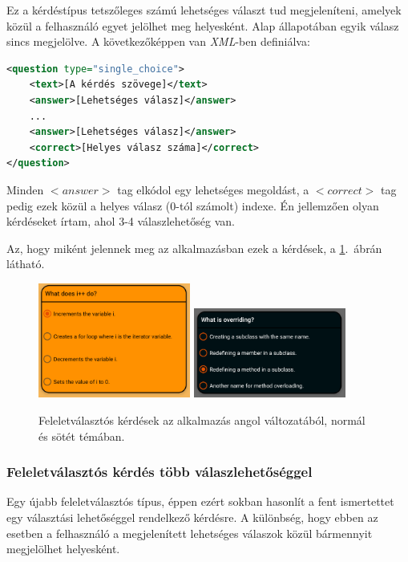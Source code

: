 \documentclass[12pt,a4paper]{article}
\newcommand{\xml}{\textit{XML}\xspace}
\begin{document}
	Ez a kérdéstípus tetszőleges számú lehetséges választ tud megjeleníteni, amelyek közül a felhasználó egyet jelölhet meg helyesként. Alap állapotában egyik válasz sincs megjelölve. A következőképpen van \xml-ben definiálva:
	
	\bigskip
	\begin{lstlisting}[language=XML]
<question type="single_choice">
	<text>[A kérdés szövege]</text>
	<answer>[Lehetséges válasz]</answer>
	...
	<answer>[Lehetséges válasz]</answer>
	<correct>[Helyes válasz száma]</correct>
</question>
	\end{lstlisting}
	\bigskip
	
	Minden $<answer>$ tag elkódol egy lehetséges megoldást, a $<correct>$ tag pedig ezek közül a helyes válasz (0-tól számolt) indexe. Én jellemzően olyan kérdéseket írtam, ahol 3-4 válaszlehetőség van. 
	
	Az, hogy miként jelennek meg az alkalmazásban ezek a kérdések, a \ref{question_single_choice_figure}.\ ábrán látható.
	
	\begin{figure}[h!]
		\centering
		\includegraphics[width=5cm]{question_single_choice}
		\includegraphics[width=5cm]{question_single_choice_dark}
		\caption{Feleletválasztós kérdések az alkalmazás angol változatából, normál és sötét témában.}
		\label{question_single_choice_figure}
	\end{figure}
	
	\subsubsection{Feleletválasztós kérdés több válaszlehetőséggel}
	
	Egy újabb feleletválasztós típus, éppen ezért sokban hasonlít a fent ismertettet egy választási lehetőséggel rendelkező kérdésre. A különbség, hogy ebben az esetben a felhasználó a megjelenített lehetséges válaszok közül bármennyit megjelölhet helyesként.
	
\end{document}
